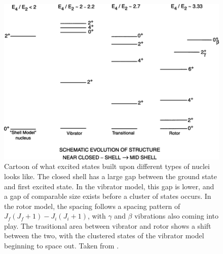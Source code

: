 \begin{figure}
    \centering
    \includegraphics[scale=2]{Introduction_Figs/EvolutionofStructureCasten.png}
    \caption{Cartoon of what excited states built upon different types of nuclei looks like. The closed shell has a large gap between the ground state and first excited state. In the vibrator model, this gap is lower, and a gap of comparable size exists before a cluster of states occurs. In the rotor model, the spacing follows a spacing pattern of $J_f(J_f+1)-J_i(J_i+1)$, with $\gamma$ and $\beta$ vibrations also coming into play. The trasitional area between vibrator and rotor shows a shift between the two, with the clustered states of the vibrator model beginning to space out. Taken from \citep{casten90:_structure}.}
    \label{fig:statestructure}
\end{figure}